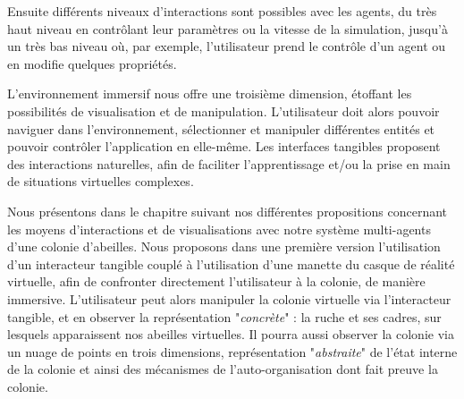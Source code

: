 		Ensuite différents niveaux d'interactions sont possibles avec les agents, du très haut niveau en contrôlant leur paramètres ou la vitesse de la simulation, jusqu'à un très bas niveau où, par exemple, l'utilisateur prend le contrôle d'un agent ou en modifie quelques propriétés.
		
		L'environnement immersif nous offre une troisième dimension, étoffant les possibilités de visualisation et de manipulation. L'utilisateur doit alors pouvoir naviguer dans l'environnement, sélectionner et manipuler différentes entités et pouvoir contrôler l'application en elle-même. Les interfaces tangibles proposent des interactions naturelles, afin de faciliter l'apprentissage et/ou la prise en main de situations virtuelles complexes.
		
		Nous présentons dans le chapitre suivant nos différentes propositions concernant les moyens d'interactions et de visualisations avec notre système multi-agents d'une colonie d'abeilles. Nous proposons dans une première version l'utilisation d'un interacteur tangible couplé à l'utilisation d'une manette du casque de réalité virtuelle, afin de confronter directement l'utilisateur à la colonie, de manière immersive.	
		L'utilisateur peut alors manipuler la colonie virtuelle via l'interacteur tangible, et en observer la représentation "\textit{concrète}" : la ruche et ses cadres, sur lesquels apparaissent nos abeilles virtuelles.
		Il pourra aussi observer la colonie via un nuage de points en trois dimensions, représentation "\textit{abstraite}" de l'état interne de la colonie et ainsi des mécanismes de l'auto-organisation dont fait preuve la colonie.